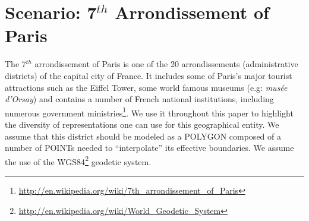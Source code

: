 \begin{table}[!htbp]
\end{table}



\section{Scenario: 7$^{th}$ Arrondissement of Paris}                      \label{sec:scenario}

The 7$^{th}$ arrondissement of Paris is one of the 20 arrondissements (administrative districts) of the capital city of France. It includes some of Paris's major tourist attractions such as the Eiffel Tower, some world famous museums (e.g: \textit{mus\'{e}e d'Orsay}) and contains a number of French national institutions, including numerous government ministries\footnote{\url{http://en.wikipedia.org/wiki/7th_arrondissement_of_Paris}}. We use it throughout this paper to highlight the diversity of representations one can use for this geographical entity. We assume that this district should be modeled as a POLYGON composed of a number of POINTs needed to ``interpolate'' its effective boundaries. We assume the use of the WGS84\footnote{\url{http://en.wikipedia.org/wiki/World_Geodetic_System}} geodetic system.

